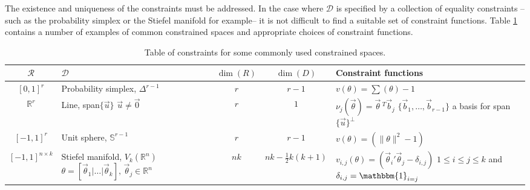 \documentclass[10pt,fleqn]{article} \pdfoutput=1
\DeclareMathOperator{\1}{\mathbbm{1}} \DeclareMathOperator{\bigO}{\mc O}
\begin{document}
The existence and uniqueness of the constraints must be addressed.  In the
case where $\mathcal{D}$ is specified by a collection of equality
constraints -- such as the probability simplex or the Stiefel manifold for
example--  it is not difficult to find a suitable set of constraint
functions. Table \ref{TABLE:Equality_constraints_examples} contains a
number of examples of common constrained spaces and appropriate choices of
constraint functions.  \renewcommand{\arraystretch}{1.5} \begin{table}[h!]
	\begin{center} \begin{tabular}{| c | m{4 cm} | c | c | m{6cm} |}
			\hline $\mathcal{R}$                           & $\mathcal{D}$                                  & $\dim(R)$ &
			$\dim(D)$                                      & Constraint functions                                                        \\ \hline $[0,1]^r$ &
			Probability simplex, $\Delta^{r-1}$                 & $r$                                            & $r-1$     & $v(\theta)
				= \sum(\theta) -1$                                                                                                           \\ \hline $\mathbb{R}^r$ & Line,
			span$\{\vec{u}\}$ \newline $\vec{u}\ne\vec{0}$ & $r$                                            & $1$
			                                               &
			$\nu_j(\vec{\theta}) = \vec{\theta}\,^T\vec{b}_j$ \newline
			$\{\vec{b}_1,\dots,\vec{b}_{r-1}\}$ a basis for
			span$\{\vec{u}\}^\perp$                                                                                                      \\ \hline $[-1,1]^r$ & Unit
			sphere, $\mathbb{S}^{r-1}$                     & $r$                                            & $r-1$     & $v(\theta) =
				(\|\theta\|^2 -1)$                                                                                                    \\ \hline $[-1,1]^{n\times
			k}$                                            & Stiefel manifold, $V_k(\mathbb{R}^n)$ \newline
			$\theta = [\vec{\theta}_1 | \dots | \vec{\theta}_k], \,
			\vec{\theta}_j \in \mathbb{R}^n$               & $nk$                                           & $nk -
			\frac{1}{2}k(k+1)$                             & $v_{i,j}(\theta) = (
				\vec{\theta}_i'\vec{\theta}_j- \delta_{i,j})$ \newline
			$1\le i \le j \le k$ and $\delta_{i,j} = \mathbbm{1}_{i=j}$
			\\ \hline\end{tabular} \end{center} \caption{Table of
		constraints for some commonly used constrained spaces.}
	\label{TABLE:Equality_constraints_examples} \end{table}
\end{document}
